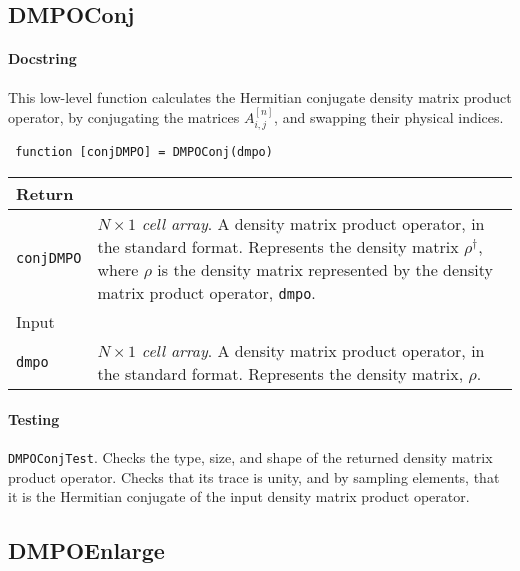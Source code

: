  \subsection{DMPOConj}
 \paragraph{Docstring} This low-level function calculates the Hermitian conjugate density matrix product operator, by conjugating the matrices \(A^{[n]}_{i,j}\), and swapping their physical indices.
 \begin{lstlisting}
 function [conjDMPO] = DMPOConj(dmpo) \end{lstlisting}
 \begin{longtabu}{X[1,l]X[4,l]}
 \hline
 Return & \\ \hline
 \lstinline$conjDMPO$ & \emph{\(N \times 1\) cell array}. A density matrix product operator, in the standard format. Represents the density matrix \(\rho^{\dagger}\), where \(\rho\) is the density matrix represented by the density matrix product operator, \lstinline$dmpo$. \\ \hline
 Input & \\ \hline
 \lstinline$dmpo$ & \emph{\(N \times 1\) cell array}. A density matrix product operator, in the standard format. Represents the density matrix, \(\rho\). \\
 \hline
 \end{longtabu}
 \paragraph{Testing} \lstinline$DMPOConjTest$. Checks the type, size, and shape of the returned density matrix product operator. Checks that its trace is unity, and by sampling elements, that it is the Hermitian conjugate of the input density matrix product operator.

 \subsection{DMPOEnlarge}
